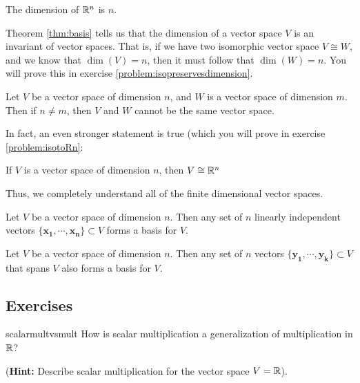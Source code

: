     \begin{example}
    The dimension of $\mathbb{R}^n$ is $n$.
    \end{example}
    
    
    Theorem \ref{thm:basis} tells us that the dimension of a vector space $V$ is an invariant of vector spaces. That is, if we have two isomorphic vector space $V \cong W$, and we know that $\dim(V) = n$, then it must follow that $\dim(W) = n$.  You will prove this in exercise \ref{problem:isopreservesdimension}.
    
    \begin{corollary}
    Let $V$ be a vector space of dimension $n$, and $W$ is a vector space of dimension $m$.   Then if $n \neq m$, then $V$ and $W$ cannot be the same vector space.
    \end{corollary}
    
    In fact, an even stronger statement is true (which you will prove in exercise \ref{problem:isotoRn}:
    
    \begin{theorem}
        If $V$ is a vector space of dimension $n$, then $V \cong \mathbb{R}^n$
    \end{theorem}
    
    Thus, we completely understand all of the finite dimensional vector spaces.
    
    
    \begin{proposition}
    Let $V$ be a vector space of dimension $n$.  Then any set of $n$ linearly independent vectors $\{\bm{x_1}, \cdots, \bm{x_n}\} \subset V$ forms a basis for $V$.
    \end{proposition}
    
    \begin{proposition}
    Let $V$ be a vector space of dimension $n$.  Then any set of $n$ vectors $\{\bm{y_1}, \cdots, \bm{y_k}\} \subset V$ that spans $V$ also forms a basis for $V$.
    \end{proposition}
    
\subsection{Exercises}
    
    
    \begin{problem}{scalarmultvsmult}
    How is scalar multiplication a generalization of multiplication in $\mathbb{R}$?  

    (\textbf{Hint:} Describe scalar multiplication for the vector space $V = \mathbb{R}$).
\end{problem}
    
